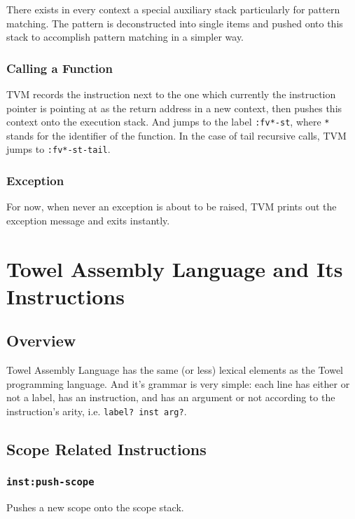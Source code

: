\documentclass{article}
\newcommand{\inst}[1] {\texttt{inst:#1}}
\begin{document}
There exists in every context a special auxiliary stack particularly for pattern matching. The pattern is deconstructed into single items and pushed onto this stack to accomplish pattern matching in a simpler way.

\subsubsection{Calling a Function}

TVM records the instruction next to the one which currently the instruction pointer is pointing at as the return address in a new context, then pushes this context onto the execution stack. And jumps to the label \texttt{:fv*-st}, where \texttt{*} stands for the identifier of the function. In the case of tail recursive calls, TVM jumps to \texttt{:fv*-st-tail}.

\subsubsection{Exception}

For now, when never an exception is about to be raised, TVM prints out the exception message and exits instantly.

\section{Towel Assembly Language and Its Instructions}

\subsection{Overview}

Towel Assembly Language has the same (or less) lexical elements as the Towel programming language. And it's grammar is very simple: each line has either or not a label, has an instruction, and has an argument or not according to the instruction's arity, i.e. \texttt{label? inst arg?}.

\subsection{Scope Related Instructions}

\subsubsection{\inst{push-scope}}

Pushes a new scope onto the scope stack.
\end{document}
